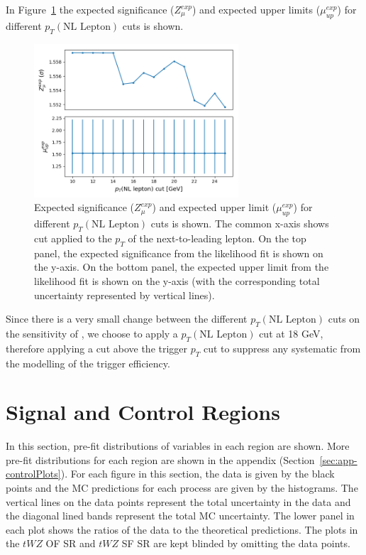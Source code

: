 In Figure~\ref{fig:4lep-NLlep-optimization} the expected significance ($Z_{\mu}^{exp}$) and expected upper limits ($\mu_{up}^{exp}$) for different $p_{T}(\text{NL Lepton})$ cuts is shown.
\begin{figure}[h!]
	\includegraphics[width = 0.68\textwidth]{figures/NL_Lep_optimization.png}
  \centering
	\caption{Expected significance ($Z_{\mu}^{exp}$) and expected upper limit ($\mu_{up}^{exp}$) for different $p_{T}(\text{NL Lepton})$ cuts is shown. The common x-axis shows cut applied to the $p_{T}$ of the next-to-leading lepton. On the top panel, the expected significance from the likelihood fit is shown on the y-axis. On the bottom panel, the expected upper limit from the likelihood fit is shown on the y-axis (with the corresponding total uncertainty represented by vertical lines).}
	\label{fig:4lep-NLlep-optimization}
\end{figure}

Since there is a very small change between the different $p_{T}(\text{NL Lepton})$ cuts on the sensitivity of \tWZ, we choose to apply a $p_{T}(\text{NL Lepton})$ cut at 18 GeV, therefore applying a cut above the trigger $p_{T}$ cut to suppress any systematic from the modelling of the trigger efficiency.

\section{Signal and Control Regions}

In this section, pre-fit distributions of variables in each region are shown. More pre-fit distributions for each region are shown in the appendix (Section~\ref{sec:app-controlPlots}). For each figure in this section, the data is given by the black points and the MC predictions for each process are given by the histograms. The vertical lines on the data points represent the total uncertainty in the data and the diagonal lined bands represent the total MC uncertainty. The lower panel in each plot shows the ratios of the data to the theoretical predictions. The plots in the $tWZ$ OF SR and $tWZ$ SF SR are kept blinded by omitting the data points.


